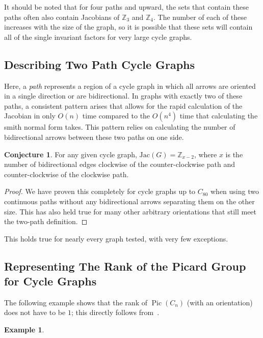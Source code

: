 \documentclass[11pt,reqno]{amsart}
\DeclareMathOperator{\Pic}{Pic}
\newcommand{\Jac}{\textrm{Jac}}{}
\theoremstyle{definition}
\newtheorem{myeg}[mydef]{\textbf{Example}}
\newtheorem{conj}[mydef]{\textbf{Conjecture}}
\theoremstyle{plain}
\begin{document}
		It should be noted that for four paths and upward, the sets that contain these paths often also contain
		Jacobians of $\mathbb{Z}_3$ and $\mathbb{Z}_4$.  The number of each of these increases with the size of the
		graph, so it is possible that these sets will contain all of the single invariant factors for very
		large cycle graphs.

	\subsection{Describing Two Path Cycle Graphs}
		Here, a \textit{path} represents a region of a cycle graph in which all arrows are oriented in a single
		direction or are bidirectional.  In graphs with exactly two of these paths, a consistent pattern arises
		that allows for the rapid calculation of the Jacobian in only $O(n)$ time compared to the $O(n^4)$ time
		that calculating the smith normal form takes. This pattern relies on calculating the number
		of bidirectional arrows between these two paths on one side.

		\begin{conj}
			For any given cycle graph, $\Jac(G)=\mathbb{Z}_{x-2}$, where $x$ is the number of
			bidirectional edges clockwise of the counter-clockwise path and counter-clockwise of the clockwise path.
		\end{conj}
		\begin{proof}
			We have proven this completely for cycle graphs up to $C_{80}$ when using two continuous paths without
			any bidirectional arrows separating them on the other size.  This has also held true for many other
			arbitrary orientations that still meet the two-path definition.
		\end{proof}

		This holds true for nearly every graph tested, with very few exceptions.

	\subsection{Representing The Rank of the Picard Group for Cycle Graphs}
		The following example shows that the rank of $\Pic(C_n)$ (with an orientation) does not have to be $1$;
		this directly follows from~\cite[Corollary 3.5]{wagner2000critical}.

		\begin{myeg}
		\end{myeg}
\end{document}
